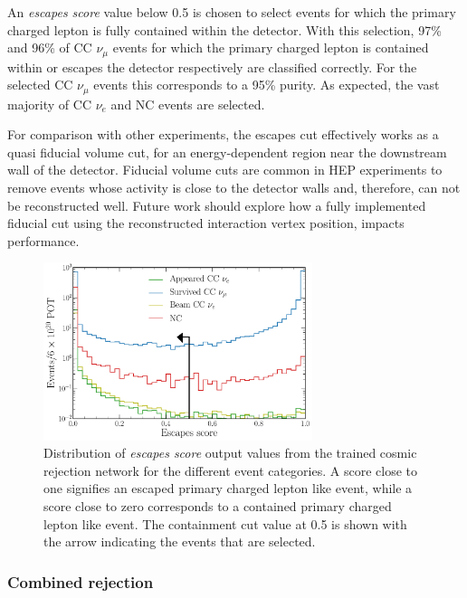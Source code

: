 An \emph{escapes score} value below 0.5 is chosen to select events for which the primary charged
lepton is fully contained within the detector. With this selection, 97\% and 96\% of CC
$\nu_{\mu}$ events for which the primary charged lepton is contained within or escapes the
detector respectively are classified correctly. For the selected CC $\nu_{\mu}$ events this
corresponds to a 95\% purity. As expected, the vast majority of CC $\nu_{e}$ and NC events are
selected.

For comparison with other experiments, the escapes cut effectively works as a quasi fiducial
volume cut, for an energy-dependent region near the downstream wall of the detector. Fiducial
volume cuts are common in HEP experiments to remove events whose activity is close to the detector
walls and, therefore, can not be reconstructed well. Future work should explore how a fully
implemented fiducial cut using the reconstructed interaction vertex position, impacts performance.

\begin{figure} %
    \includegraphics[width=0.7\textwidth]{diagrams/7-results/final_escapes_outputs.pdf}
    \caption[Distribution of escapes score output values]
    {Distribution of \emph{escapes score} output values from the trained cosmic rejection network
        for the different event categories. A score close to one signifies an escaped primary
        charged lepton like event, while a score close to zero corresponds to a contained primary
        charged lepton like event. The containment cut value at 0.5 is shown with the arrow
        indicating the events that are selected.}
    \label{fig:final_escapes_outputs}
\end{figure}

\subsubsection*{Combined rejection} %

